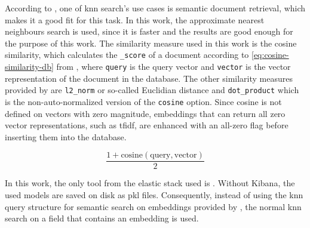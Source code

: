 According to \citeauthor{Elasticsearch-kNN-HNSW}, one of \ac{knn} search's use cases is semantic document retrieval, which makes it a good fit for this task.
In this work, the approximate nearest neighbours search is used, since it is faster and the results are good enough for the purpose of this work.
The similarity measure used in this work is the cosine similarity, which calculates the \texttt{\_score} of a document according to \autoref{eq:cosine-similarity-db} from \cite{Elasticsearch-kNN-similarity}, 
where \texttt{query} is the query vector and \texttt{vector} is the vector representation of the document in the database.
The other similarity measures provided by \databaseName{} are \texttt{l2\_norm} or 
so-called Euclidian distance and \texttt{dot\_product} which is the non-auto-normalized version of the \texttt{cosine} option.
Since cosine is not defined on vectors with zero magnitude, embeddings that can return all zero vector representations, such as \ac{tfidf}, 
are enhanced with an all-zero flag before inserting them into the database.

\begin{equation}
    \frac{1 + \text{cosine}(\text{query}, \text{vector})}{2}
    \label{eq:cosine-similarity-db}
\end{equation}

In this work, the only tool from the elastic stack used is \databaseName{}.
Without Kibana, the used models are saved on disk as \ac{pkl} files.
Consequently, instead of using the \ac{knn} query structure for semantic search on embeddings provided by \databaseName{}, the normal \ac{knn} search on a field that contains an embedding is used.